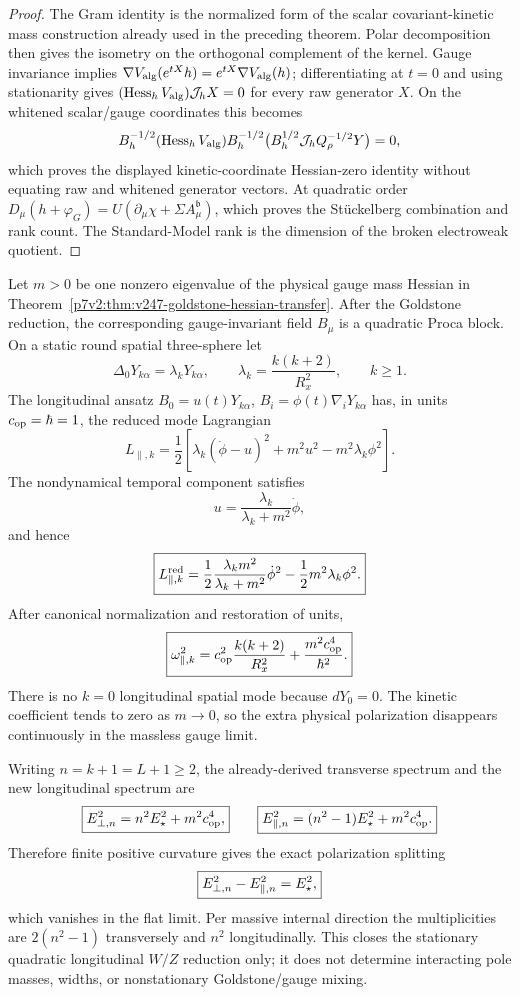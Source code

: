 \documentclass[12pt,a4paper]{article}
\begin{document}
\begin{proof}
The Gram identity is the normalized form of the scalar covariant-kinetic
mass construction already used in the preceding theorem.  Polar decomposition
then gives the isometry on the orthogonal complement of the kernel.  Gauge
invariance implies
\(\nabla V_{\rm alg}(e^{tX}h)=e^{tX}\nabla V_{\rm alg}(h)\); differentiating
at \(t=0\) and using stationarity gives
\((\operatorname{Hess}_hV_{\rm alg})\mathcal J_hX=0\) for every
raw generator \(X\). On the whitened scalar/gauge coordinates this becomes
\[
 B_h^{-1/2}(\operatorname{Hess}_hV_{\rm alg})B_h^{-1/2}
 \bigl(B_h^{1/2}\mathcal J_hQ_\rho^{-1/2}Y\bigr)=0,
\]
which proves the displayed kinetic-coordinate Hessian-zero identity
without equating raw and whitened generator vectors.
At quadratic order
\(D_\mu(h+\varphi_G)=U(\partial_\mu\chi+\Sigma A_\mu^{\mathfrak b})\),
which proves the Stückelberg combination and rank count.  The Standard-Model
rank is the dimension of the broken electroweak quotient.
\end{proof}

\begin{theorem}
\label{p7v2:thm:v247-longitudinal-vector-spectrum}
Let \(m>0\) be one nonzero eigenvalue of the physical gauge mass Hessian in
Theorem~\ref{p7v2:thm:v247-goldstone-hessian-transfer}.  After the Goldstone
reduction, the corresponding gauge-invariant field \(B_\mu\) is a quadratic
Proca block.  On a static round spatial three-sphere let
\[
 \Delta_0Y_{k\alpha}=\lambda_kY_{k\alpha},
 \qquad
 \lambda_k=\frac{k(k+2)}{R_x^2},\qquad k\ge1.
\]
The longitudinal ansatz
\(B_0=u(t)Y_{k\alpha}\),
\(B_i=\phi(t)\nabla_iY_{k\alpha}\) has, in units
\(c_{\rm op}=\hbar=1\), the reduced mode Lagrangian
\[
 L_{\parallel,k}
 =\frac12\left[
 \lambda_k(\dot\phi-u)^2+m^2u^2-m^2\lambda_k\phi^2\right].
\]
The nondynamical temporal component satisfies
\[
 \boxed{u=\frac{\lambda_k}{\lambda_k+m^2}\dot\phi,}
\]
and hence
\[
 \boxed{L_{\parallel,k}^{\rm red}
 =\frac12\frac{\lambda_km^2}{\lambda_k+m^2}\dot\phi^2
 -\frac12m^2\lambda_k\phi^2.}
\]
After canonical normalization and restoration of units,
\[
 \boxed{\omega_{\parallel,k}^2
 =c_{\rm op}^2\frac{k(k+2)}{R_x^2}
 +\frac{m^2c_{\rm op}^4}{\hbar^2}.}
\]
There is no \(k=0\) longitudinal spatial mode because \(dY_0=0\).  The
kinetic coefficient tends to zero as \(m\to0\), so the extra physical
polarization disappears continuously in the massless gauge limit.

Writing \(n=k+1=L+1\ge2\), the already-derived transverse spectrum and the
new longitudinal spectrum are
\[
 \boxed{E_{\perp,n}^2=n^2E_\star^2+m^2c_{\rm op}^4,}
 \qquad
 \boxed{E_{\parallel,n}^2=(n^2-1)E_\star^2+m^2c_{\rm op}^4.}
\]
Therefore finite positive curvature gives the exact polarization splitting
\[
 \boxed{E_{\perp,n}^2-E_{\parallel,n}^2=E_\star^2,}
\]
which vanishes in the flat limit.  Per massive internal direction the
multiplicities are \(2(n^2-1)\) transversely and \(n^2\) longitudinally.
This closes the stationary quadratic longitudinal \(W/Z\) reduction only; it
does not determine interacting pole masses, widths, or nonstationary
Goldstone/gauge mixing.
\end{theorem}
\end{document}
